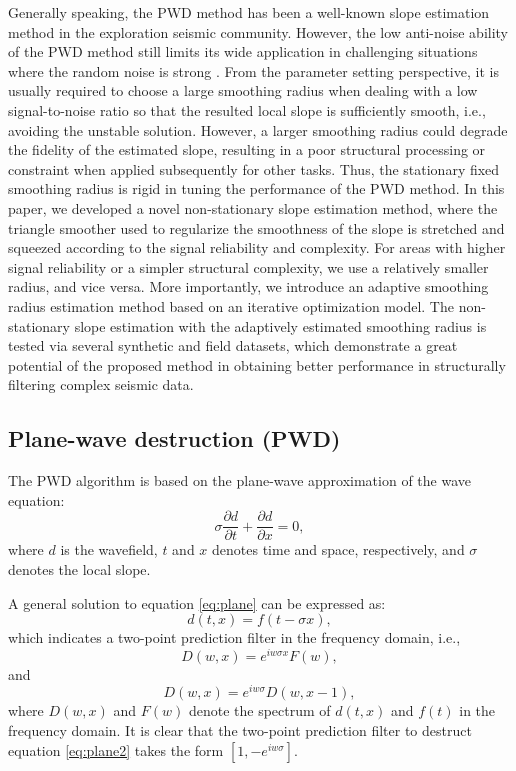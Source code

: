 Generally speaking, the PWD method has been a well-known slope estimation method in the exploration seismic community. However, the low anti-noise ability of the PWD method still limits its wide application in challenging situations where the random noise is strong \cite{curveletieee2016,yanan2014,weilin2017dlsp,shaohuan2018ieee,zhaoqiang2019tgrs,wang2019hankel}. From the parameter setting perspective, it is usually required to choose a large smoothing radius when dealing with a low signal-to-noise ratio so that the resulted local slope is sufficiently smooth, i.e., avoiding the unstable solution. However, a larger smoothing radius could degrade the fidelity of the estimated slope, resulting in a poor structural processing or constraint when applied subsequently for other tasks. Thus, the stationary fixed smoothing radius is rigid in tuning the performance of the PWD method. In this paper, we developed a novel non-stationary slope estimation method, where the triangle smoother used to regularize the smoothness of the slope is stretched and squeezed according to the signal reliability and complexity. For areas with higher signal reliability or a simpler structural complexity, we use a relatively smaller radius, and vice versa. More importantly, we introduce an adaptive smoothing radius estimation method based on an iterative optimization model. The non-stationary slope estimation with the adaptively estimated smoothing radius is tested via several synthetic and field datasets, which demonstrate a great potential of the proposed method in obtaining better performance in structurally filtering complex seismic data.  

\subsection{Plane-wave destruction (PWD)}
The PWD algorithm is based on the plane-wave approximation of the wave equation:
\begin{equation}
\label{eq:plane}
\sigma \frac{\partial d}{\partial t} + \frac{\partial d}{\partial x} = 0,
\end{equation}
where $d$ is the wavefield, $t$ and $x$ denotes time and space, respectively, and $\sigma$ denotes the local slope. 

A general solution to equation \ref{eq:plane} can be expressed as: 
\begin{equation}
\label{eq:plane}
d(t,x) = f(t-\sigma x),
\end{equation}
which indicates a two-point prediction filter in the frequency domain, i.e.,
\begin{equation}
\label{eq:plane1}
D(w,x) = e^{iw\sigma x}F(w),
\end{equation}
and
\begin{equation}
\label{eq:plane2}
D(w,x) = e^{iw\sigma }D(w,x-1) ,
\end{equation}
where $D(w,x)$ and $F(w)$ denote the spectrum of $d(t,x)$ and $f(t)$ in the frequency domain. It is clear that the two-point prediction filter to destruct equation \ref{eq:plane2} takes the form $[1,-e^{iw\sigma }]$. 

